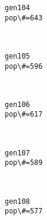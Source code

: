 \documentclass[11pt]{article}
\begin{document}
    \begin{Verbatim}[commandchars=\\\{\}]
gen104
pop\#=643

    \end{Verbatim}

    \begin{center}
    \end{center}
    { \hspace*{\fill} \\}
    
    \begin{Verbatim}[commandchars=\\\{\}]
gen105
pop\#=596

    \end{Verbatim}

    \begin{center}
    \end{center}
    { \hspace*{\fill} \\}
    
    \begin{Verbatim}[commandchars=\\\{\}]
gen106
pop\#=617

    \end{Verbatim}

    \begin{center}
    \end{center}
    { \hspace*{\fill} \\}
    
    \begin{Verbatim}[commandchars=\\\{\}]
gen107
pop\#=589

    \end{Verbatim}

    \begin{center}
    \end{center}
    { \hspace*{\fill} \\}
    
    \begin{Verbatim}[commandchars=\\\{\}]
gen108
pop\#=577

    \end{Verbatim}
\end{document}
